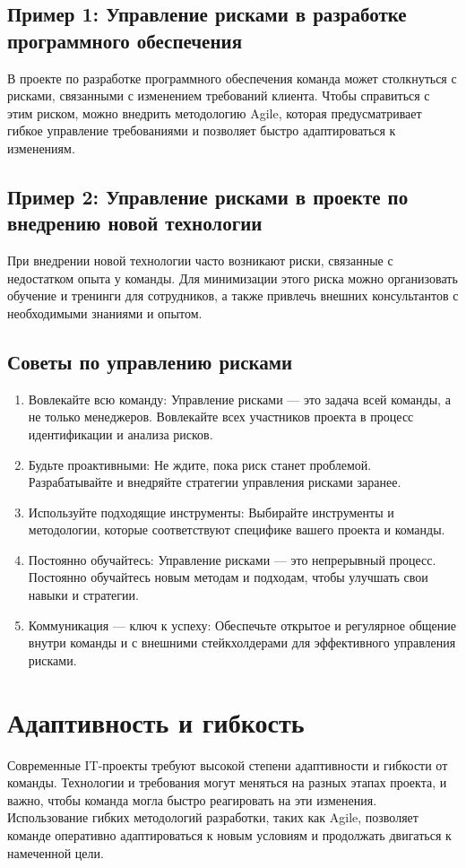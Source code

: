     \subsection{Пример 1: Управление рисками в разработке программного обеспечения}
    В проекте по разработке программного обеспечения команда может столкнуться с рисками, связанными с изменением требований клиента. Чтобы справиться с этим риском, можно внедрить методологию Agile, которая предусматривает гибкое управление требованиями и позволяет быстро адаптироваться к изменениям.

    \subsection{Пример 2: Управление рисками в проекте по внедрению новой технологии}
    При внедрении новой технологии часто возникают риски, связанные с недостатком опыта у команды. Для минимизации этого риска можно организовать обучение и тренинги для сотрудников, а также привлечь внешних консультантов с необходимыми знаниями и опытом.

    \subsection{Советы по управлению рисками}
    \begin{enumerate}
        \item Вовлекайте всю команду: Управление рисками — это задача всей команды, а не только менеджеров. Вовлекайте всех участников проекта в процесс идентификации и анализа рисков.
        \item Будьте проактивными: Не ждите, пока риск станет проблемой. Разрабатывайте и внедряйте стратегии управления рисками заранее.
        \item Используйте подходящие инструменты: Выбирайте инструменты и методологии, которые соответствуют специфике вашего проекта и команды.
        \item Постоянно обучайтесь: Управление рисками — это непрерывный процесс. Постоянно обучайтесь новым методам и подходам, чтобы улучшать свои навыки и стратегии.
        \item Коммуникация — ключ к успеху: Обеспечьте открытое и регулярное общение внутри команды и с внешними стейкхолдерами для эффективного управления рисками.
    \end{enumerate}

    \section{Адаптивность и гибкость}
    Современные IT-проекты требуют высокой степени адаптивности и гибкости от команды. Технологии и требования могут меняться на разных этапах проекта, и важно, чтобы команда могла быстро реагировать на эти изменения. Использование гибких методологий разработки, таких как Agile, позволяет команде оперативно адаптироваться к новым условиям и продолжать двигаться к намеченной цели.

